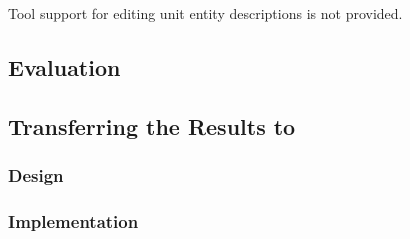 Tool support for editing unit entity descriptions is not provided.

\subsection{Evaluation}


\subsection{Transferring the Results to \UH{}}
\subsubsection{Design}
\subsubsection{Implementation}
